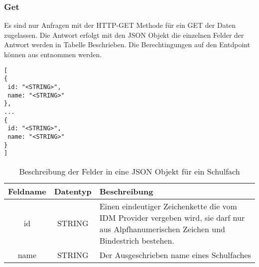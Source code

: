 \subsubsection{Get}
\label{sec:end:rest:api:school-subjects:get}
Es sind nur Anfragen mit der HTTP-GET Methode für ein GET der Daten zugelassen.
Die Antwort erfolgt mit den JSON Objekt  die einzelnen Felder der Antwort werden in Tabelle  Beschrieben.
Die Berechtingungen auf den Entdpoint können aus  entnommen werden.

\begin{lstlisting}[caption={JSON Antwort für ein GET aufruf der Route /api/school-subjects},label={lst:code:end:rest:api:school-subjects:get:ret},frame=tlrb]
[
{
 id: "<STRING>",
 name: "<STRING>"
},
...
{
 id: "<STRING>",
 name: "<STRING>"
}
]
\end{lstlisting}
\begin{table}[htb]
	\begin{tabularx}{\textwidth}{|c|c|X|}
		\hline
			\textbf{Feldname} & \textbf{Datentyp} & \textbf{Beschreibung} \\ \hline
			id & STRING & Einen eindeutiger Zeichenkette die vom IDM Provider vergeben wird, sie darf nur aus Alpfhanumerischen Zeichen und Bindestrich bestehen.\\ \hline
			name & STRING & Der Ausgeschrieben name eines Schulfaches \\ \hline
	\end{tabularx}

		\caption{Beschreibung der Felder in eine JSON Objekt für ein Schulfach}
		\label{tab:end:rest:api:school-subjects:get:ret:json}
\end{table}
